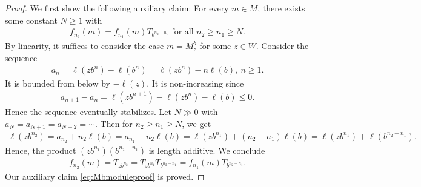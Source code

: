 \documentclass[10pt,a4paper]{amsart}
\begin{document}
\begin{proof}
We first show the following auxiliary claim:
For every $m\in M$, there exists some constant $N\geq 1$ with
        \begin{align}\label{eq:Mbmoduleproof}
            f_{n_2}(m) = f_{n_1}(m) T_{b^{n_2-n_1}}\text{ for all }n_2\geq n_1\geq N.
        \end{align}
By linearity, it suffices to consider the case $m = M^b_z$ for some $z\in W$. Consider the sequence
    \begin{align*}
        a_n = \ell(zb^n) - \ell(b^n) = \ell(zb^n) -n\ell(b),~n\geq 1.
    \end{align*}
    It is bounded from below by $-\ell(z)$. It is non-increasing since
    \begin{align*}
        a_{n+1} - a_n = \ell(zb^{n+1}) - \ell(zb^n) - \ell(b) \leq 0.
    \end{align*}
    Hence the sequence eventually stabilizes. Let $N\gg 0$ with $a_N = a_{N+1} = a_{N+2}=\cdots$. Then for $n_2\geq n_1\geq N$, we get
    \begin{align*}
        \ell(zb^{n_2}) = a_{n_2} + n_2 \ell(b) = a_{n_1} + n_2\ell(b) = \ell(zb^{n_1}) + (n_2-n_1)\ell(b) = \ell(zb^{n_1}) + \ell(b^{n_2-n_1}).
    \end{align*}
    Hence, the product $(zb^{n_1})(b^{n_2-n_1})$ is length additive. We conclude
    \begin{align*}
        f_{n_2}(m) = T_{zb^{n_2}} = T_{zb^{n_1}} T_{b^{n_2-n_1}} = f_{n_1}(m) T_{b^{n_2-n_1}}.
    \end{align*}
    Our auxiliary claim \eqref{eq:Mbmoduleproof} is proved.
    

\end{proof}
\end{document}
